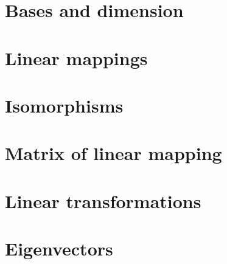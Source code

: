\documentclass[12pt]{article}
\begin{document}
\section{Bases and dimension}
\section{Linear mappings}
\section{Isomorphisms}
\section{Matrix of linear mapping}
\section{Linear transformations}
\section{Eigenvectors}
\end{document}
